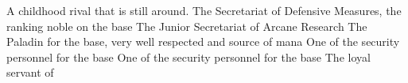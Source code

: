 \documentclass[char]{guildcamp3}
\begin{document}
\begin{contacts}
  \contact{\cMageTwo{}} A childhood rival that is still around.
  \contact{\cNobleOne{}} The Secretariat of Defensive Measures, the ranking noble on the base
  \contact{\cNobleTwo{}} The Junior Secretariat of Arcane Research
  \contact{\cPaladin{}} The Paladin for the base, very well respected and source of mana 
  \contact{\cRogueOne{}} One of the security personnel for the base
  \contact{\cRogueTwo{}} One of the security personnel for the base
  \contact{\cServant{}} The loyal servant of \cNobleOne{} 
\end{contacts}
\end{document}
